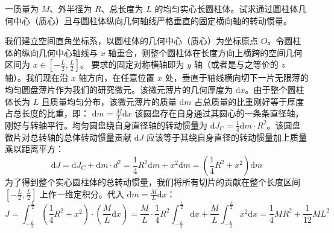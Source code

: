 \begin{example}
 一质量为 $M$、外半径为 $R$、总长度为 $L$ 的均匀实心长圆柱体。试求通过圆柱体几何中心（质心）且与圆柱体纵向几何轴线严格垂直的固定横向轴的转动惯量。
\end{example}
\begin{solution}
 我们建立空间直角坐标系，以圆柱体的几何中心（质心）为坐标原点 $O$。令圆柱体的纵向几何中心轴线与 $x$ 轴重合，则整个圆柱体在长度方向上横跨的空间几何区间为 $x \in \left[-\frac{L}{2}, \frac{L}{2}\right]$。
 要求的固定对称横轴即为 $y$ 轴（或者是与之等价的 $z$ 轴）。我们现在沿 $x$ 轴方向，在任意位置 $x$ 处，垂直于轴线横向切下一片无限薄的均匀圆盘薄片作为我们的研究微元。该微元薄片的几何厚度为 $\mathrm{d}x$。由于整个圆柱体长为 $L$ 且质量均匀分布，该微元薄片的质量 $\mathrm{d}m$ 占总质量的比重刚好等于厚度占总长度的比重，即： \(\mathrm{d}m = \frac{M}{L}\mathrm{d}x\) 该圆盘存在自身通过其圆心的一条条直径轴，刚好与转轴平行。均匀圆盘绕自身直径轴的转动惯量为 $\mathrm{d}J_C = \frac{1}{4}\mathrm{d}m \cdot R^2$。该圆盘微片对总转轴的总体转动惯量贡献 $\mathrm{d}J$ 应该等于其绕自身直径的转动惯量加上质量乘以距离平方：$$\mathrm{d}J = \mathrm{d}J_C + \mathrm{d}m \cdot d^2 = \frac{1}{4}R^2\mathrm{d}m + x^2\mathrm{d}m = \left( \frac{1}{4}R^2 + x^2 \right)\mathrm{d}m$$为了得到整个实心圆柱体的总转动惯量，我们将所有切片的贡献在整个长度区间 $\left[-\frac{L}{2}, \frac{L}{2}\right]$ 上作一维定积分。代入 $\mathrm{d}m = \frac{M}{L}\mathrm{d}x$：
 $$J = \int_{-\frac{L}{2}}^{\frac{L}{2}} \left( \frac{1}{4}R^2 + x^2 \right) \cdot \left( \frac{M}{L}\mathrm{d}x \right)= \frac{M}{L} \cdot \frac{1}{4}R^2 \int_{-\frac{L}{2}}^{\frac{L}{2}} \mathrm{d}x + \frac{M}{L} \int_{-\frac{L}{2}}^{\frac{L}{2}} x^2 \mathrm{d}x = \frac{1}{4}MR^2 + \frac{1}{12}ML^2$$
\end{solution}
